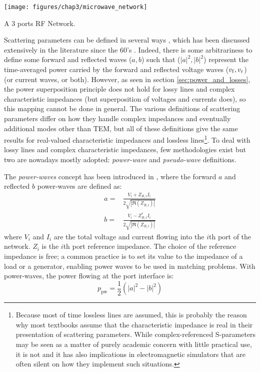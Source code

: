 \begin{marginfigure}[*-15]
	\texttt{[image: figures/chap3/microwave\_network]}
	\caption{A 3 ports RF Network.}
	\label{fig:microwave_network}
\end{marginfigure}

Scattering parameters can be defined in several ways , which has been discussed extensively in the literature since the 60's . Indeed, there is some arbitrariness to define some forward and reflected waves ($a, b$) such that ($|a|^2, |b|^2$) represent the time-averaged power carried by the forward and reflected voltage waves (${v_{\mathrm{f}}}, {v_{\mathrm{r}}}$) (or current waves, or both). However, as seen in section \ref{sec:power_and_losses}, the power superposition principle does not hold for lossy lines and complex characteristic impedances (but superposition of voltages and currents does), so this mapping cannot be done in general. The various definitions of scattering parameters differ on how they handle complex impedances and eventually additional modes other than TEM, but all of these definitions give the same results for real-valued characteristic impedances and lossless lines\footnote{Because most of time lossless lines are assumed, this is probably the reason why most textbooks assume that the characteristic impedance is real in their presentation of scattering parameters. While complex-referenced S-parameters may be seen as a matter of purely academic concern with little practical use, it is not and it has also implications in electromagnetic simulators that are often silent on how they implement such situations.}. To deal with lossy lines and complex characteristic impedances, few methodologies exist but two are nowadays mostly adopted: \textit{power-wave} and \textit{pseudo-wave}  definitions. 

The \textit{power-waves} concept has been introduced in , where the forward $a$ and reflected $b$ power-waves are defined as:
\begin{subequations}
\begin{align}
	a =& \frac{V_i + Z_{R,i} I_i}{2\sqrt{|\Re(Z_{R,i})|}} \\
	b =& \frac{V_i - Z_{R,i}^* I_i}{2\sqrt{|\Re(Z_{R,i})|}}
\end{align}
\label{eq:power-waves_definition}
\end{subequations}
where $V_i$ and $I_i$ are the total voltage and current flowing into the $i$th port of the network. $Z_{i}$ is the $i$th port reference impedance. The choice of the reference impedance is free; a common practice is to set its value to the impedance of a load or a generator, enabling power waves to be used in matching problems. With power-waves, the power flowing at the port interface is:
\begin{equation}
	p_{\mathrm{pw}} = \frac{1}{2} \left( |a|^2 - |b|^2 \right)
\end{equation}

